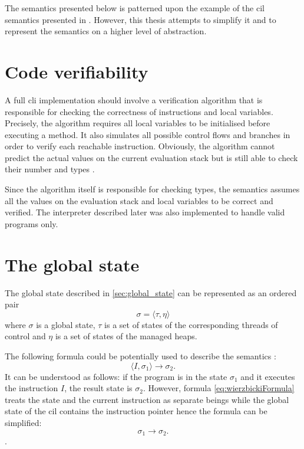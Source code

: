 \documentclass[declaration,shortabstract,english,mgr]{iithesis}
\begin{document}
The semantics presented below is patterned upon the example of the \acrshort{cil} semantics presented in \cite{zychlaThesis}. However, this thesis attempts to simplify it and to represent the semantics on a higher level of abstraction.

\section{Code verifiability}
\label{sec:codeVerifiability}

A full \acrshort{cli} implementation should involve a verification algorithm that is responsible for checking the correctness of instructions and local variables. Precisely, the algorithm requires all local variables to be initialised before executing a method. It also simulates all possible control flows and branches in order to verify each reachable instruction. Obviously, the algorithm cannot predict the actual values on the current evaluation stack but is still able to check their number and types \cite{expertIl}.

Since the algorithm itself is responsible for checking types, the semantics assumes all the values on the evaluation stack and local variables to be correct and verified. The interpreter described later was also implemented to handle valid programs only.

\section{The global state}

The global state described in \ref{sec:global_state} can be represented as an ordered pair
\begin{equation}
	\sigma = \langle\tau, \eta\rangle
\end{equation}
where $\sigma$ is a global state, $\tau$ is a set of states of the corresponding threads of control and $\eta$ is a set of states of the managed heaps.

The following formula could be potentially used to describe the semantics \cite{wierzbicki}:
\begin{equation}
\label{eq:wierzbickiFormula}
	\langle I, \sigma_1\rangle \rightarrow \sigma_2.
\end{equation}
It can be understood as follows: if the program is in the state $\sigma_1$ and it executes the instruction $I$, the result state is $\sigma_2$. However, formula \ref{eq:wierzbickiFormula} treats the state and the current instruction as separate beings while the global state of the \acrshort{cil} contains the instruction pointer hence the formula can be simplified:
\begin{equation}
\label{eq:wierzbickiFormula2}
	\sigma_1 \rightarrow \sigma_2.
\end{equation}.
\end{document}
